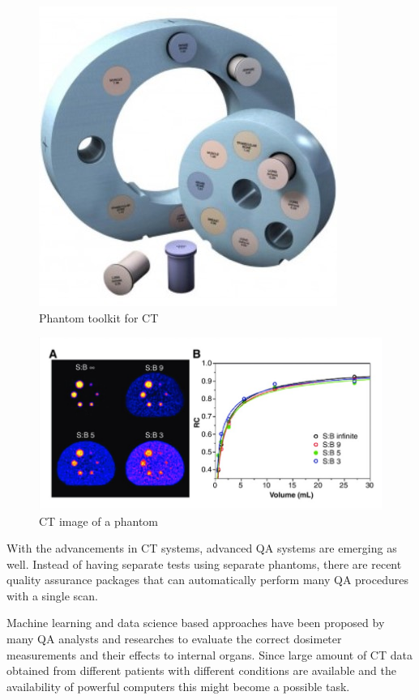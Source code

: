 \documentclass[12pt]{article}
\begin{document}
\begin{figure}[h!]
  \centering
  \includegraphics[width=0.45\linewidth]{phantom.jpg}
  \caption{\small{Phantom toolkit for CT}}
  \label{fig:Phantom toolkit for CT}
\end{figure}
\begin{figure}[h!]
  \centering
  \includegraphics[width=0.65\linewidth]{phantom1.jpg}
  \caption{\small{CT image of a phantom}}
  \label{fig:CT image of a phantom}
\end{figure}

With the advancements in CT systems, advanced QA systems are emerging as well. Instead of having separate tests using separate phantoms, there are recent quality assurance packages that can automatically perform many QA procedures with a single scan. 

Machine learning and data science based approaches have been proposed by many QA analysts and researches to evaluate the correct dosimeter measurements and their effects to internal organs. Since large amount of CT data obtained from different patients with different conditions are available and the availability of powerful computers this might become a possible task.

\pagebreak
\end{document}
